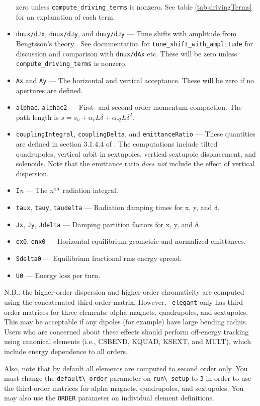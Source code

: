 \documentclass[11pt]{article}
\begin{document}
\begin{itemize}
 zero unless \verb|compute_driving_terms| is nonzero.  See table \ref{tab:drivingTerms} for an explanation of each term.
\item {\tt dnux/dJx}, {\tt dnux/dJy},  and {\tt dnuy/dJy} --- Tune shifts with amplitude from Bengtsson's theory \cite{Bengtsson}.
 See documentation for \verb|tune_shift_with_amplitude| for discussion and comparison with {\tt dnux/dAx} etc.
 These will be zero unless \verb|compute_driving_terms| is nonzero.
\item {\tt Ax} and {\tt Ay} --- The horizontal and vertical acceptance.  These will be zero if no apertures are
  defined.
\item {\tt alphac}, {\tt alphac2} --- First- and second-order momentum compaction.  The path length is 
  $s = s_o + \alpha_c L \delta + \alpha_{c2} L \delta^2$.
\item {\tt couplingIntegral}, {\tt couplingDelta}, and {\tt emittanceRatio} --- These quantities are defined
  in section 3.1.4.4 of \cite{HAPE}.  The computations include tilted quadrupoles, vertical orbit in sextupoles,
  vertical sextupole displacement, and solenoids.  Note that the emittance ratio {\em does not} include 
  the effect of vertical dispersion.
\item {\tt I}{\em n} --- The $n^{\rm th}$ radiation integral.
\item {\tt taux}, {\tt tauy}, {\tt taudelta} --- Radiation damping times for x, y, and $\delta$.
\item {\tt Jx}, {\tt Jy}, {\tt Jdelta} --- Damping partition factors for  x, y, and $\delta$.
\item {\tt ex0}, {\tt enx0} --- Horizontal equilibrium geometric and normalized emittances.
\item {\tt Sdelta0} --- Equilibrium fractional rms energy spread.
\item {\tt U0} --- Energy loss per turn.
\end{itemize}

N.B.: the higher-order dispersion and higher-order chromaticity are
computed using the concatenated third-order matrix.  However, {\tt
elegant} only has third-order matrices for three elements:
alpha magnets, quadrupoles, and sextupoles.  This may be acceptable if
any dipoles (for example) have large bending radius.  Users who are
concerned about these effects should perform off-energy tracking using
canonical elements (i.e., CSBEND, KQUAD, KSEXT, and MULT), which
include energy dependence to all orders.

Also, note that by default all elements are computed to second order
only.  You must change the \verb|default\_order| parameter on
\verb|run\_setup| to \verb|3| in order to use the third-order matrices
for alpha magnets, quadrupoles, and sextupoles.  You may also use the
{\tt ORDER} parameter on individual element definitions.
\end{document}
